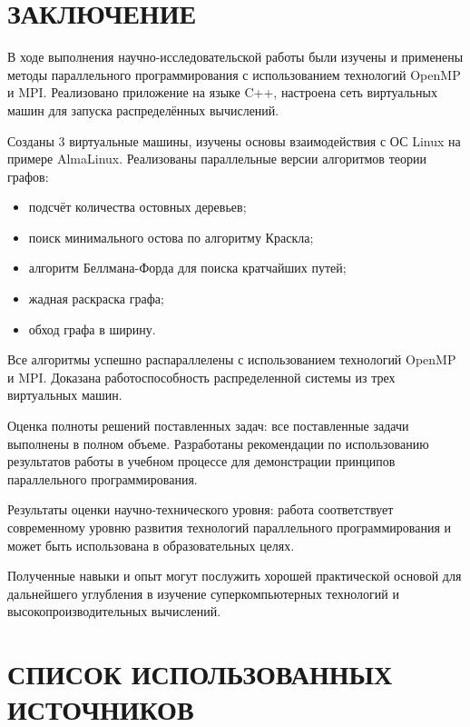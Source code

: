 \documentclass[11pt,a4paper,final]{article}
\begin{document}
\newpage
\section*{ЗАКЛЮЧЕНИЕ}

В ходе выполнения научно-исследовательской работы были изучены и применены методы параллельного программирования с использованием технологий OpenMP и MPI. Реализовано приложение на языке C++, настроена сеть виртуальных машин для запуска распределённых вычислений.

Созданы 3 виртуальные машины, изучены основы взаимодействия с ОС Linux на примере AlmaLinux. Реализованы параллельные версии алгоритмов теории графов:
\begin{itemize}
	\item подсчёт количества остовных деревьев;
	\item поиск минимального остова по алгоритму Краскла;
	\item алгоритм Беллмана-Форда для поиска кратчайших путей;
	\item жадная раскраска графа;
	\item обход графа в ширину.
\end{itemize}

Все алгоритмы успешно распараллелены с использованием технологий OpenMP и MPI. Доказана работоспособность распределенной системы из трех виртуальных машин.

Оценка полноты решений поставленных задач: все поставленные задачи выполнены в полном объеме. Разработаны рекомендации по использованию результатов работы в учебном процессе для демонстрации принципов параллельного программирования.

Результаты оценки научно-технического уровня: работа соответствует современному уровню развития технологий параллельного программирования и может быть использована в образовательных целях.

Полученные навыки и опыт могут послужить хорошей практической основой для дальнейшего углубления в изучение суперкомпьютерных технологий и высокопроизводительных вычислений.

\newpage
\section*{СПИСОК ИСПОЛЬЗОВАННЫХ ИСТОЧНИКОВ}
\end{document}
